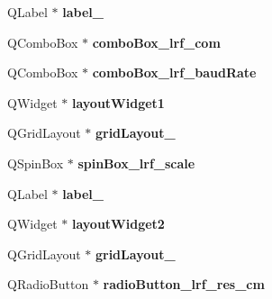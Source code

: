 \begin{DoxyCompactItemize}
\item 
\hypertarget{class_ui___main_window_a2e2516d755e4dd53fc905dabddf2738a}{}Q\+Label $\ast$ {\bfseries label\+\_}\label{class_ui___main_window_a2e2516d755e4dd53fc905dabddf2738a}

\item 
\hypertarget{class_ui___main_window_a67b26eb96863ddea8f96f5711eec2b85}{}Q\+Combo\+Box $\ast$ {\bfseries combo\+Box\+\_\+lrf\+\_\+com}\label{class_ui___main_window_a67b26eb96863ddea8f96f5711eec2b85}

\item 
\hypertarget{class_ui___main_window_a5d3f4747e662e55f1bc8ff6e6d0029ca}{}Q\+Combo\+Box $\ast$ {\bfseries combo\+Box\+\_\+lrf\+\_\+baud\+Rate}\label{class_ui___main_window_a5d3f4747e662e55f1bc8ff6e6d0029ca}

\item 
\hypertarget{class_ui___main_window_aab31b3dec8d767525dea6f163e029e48}{}Q\+Widget $\ast$ {\bfseries layout\+Widget1}\label{class_ui___main_window_aab31b3dec8d767525dea6f163e029e48}

\item 
\hypertarget{class_ui___main_window_af42ea7d4c2e893181caad21e28166932}{}Q\+Grid\+Layout $\ast$ {\bfseries grid\+Layout\+\_}\label{class_ui___main_window_af42ea7d4c2e893181caad21e28166932}

\item 
\hypertarget{class_ui___main_window_a84fcb366bdfd4438dac9870225183220}{}Q\+Spin\+Box $\ast$ {\bfseries spin\+Box\+\_\+lrf\+\_\+scale}\label{class_ui___main_window_a84fcb366bdfd4438dac9870225183220}

\item 
\hypertarget{class_ui___main_window_a78c7e10730b43c6700cd7216911ed76a}{}Q\+Label $\ast$ {\bfseries label\+\_}\label{class_ui___main_window_a78c7e10730b43c6700cd7216911ed76a}

\item 
\hypertarget{class_ui___main_window_a6cda85bb4cf776930c0f4d4dcf906751}{}Q\+Widget $\ast$ {\bfseries layout\+Widget2}\label{class_ui___main_window_a6cda85bb4cf776930c0f4d4dcf906751}

\item 
\hypertarget{class_ui___main_window_a8ee86315639f324b17708efc7dbe8b19}{}Q\+Grid\+Layout $\ast$ {\bfseries grid\+Layout\+\_}\label{class_ui___main_window_a8ee86315639f324b17708efc7dbe8b19}

\item 
\hypertarget{class_ui___main_window_acaecd1db33f9aa13dba05c3d8eed664e}{}Q\+Radio\+Button $\ast$ {\bfseries radio\+Button\+\_\+lrf\+\_\+res\+\_\+cm}\label{class_ui___main_window_acaecd1db33f9aa13dba05c3d8eed664e}


\end{DoxyCompactItemize}
